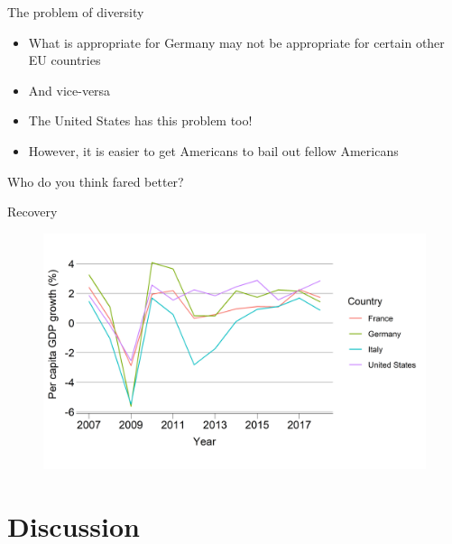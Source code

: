 \documentclass{beamer}
\begin{document}
\begin{frame}{The problem of diversity}
\begin{itemize}
    \item What is appropriate for Germany may not be appropriate for certain other EU countries\pause
    \item And vice-versa\pause
    \item The United States has this problem too!\pause
    \item However, it is easier to get Americans to bail out fellow Americans
\end{itemize}
\end{frame}

\begin{frame}{}
\centering
\alert{\Large{Who do you think fared better?}}
\end{frame}

\begin{frame}{Recovery}
\begin{figure}
    \centering
    \includegraphics[width=\textwidth]{../img/recovery.png}
\end{figure}{}
\end{frame}{}

\section{Discussion}
\end{document}
